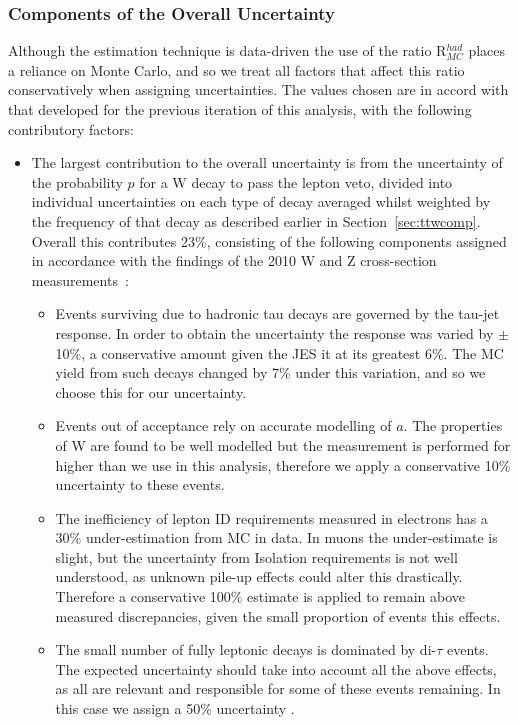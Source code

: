 \subsubsection{Components of the Overall Uncertainty}
Although the estimation technique is data-driven the use of the ratio R$^{had}_{MC}$ places a reliance on Monte Carlo, and so we treat all factors that affect this ratio conservatively when assigning uncertainties. The values chosen are in accord with that developed for the previous iteration of this analysis, with the following contributory factors:
\begin{itemize}
\item The largest contribution to the overall uncertainty is from the uncertainty of the probability $p$ for a W decay to pass the lepton veto, divided into individual uncertainties on each type of decay averaged whilst weighted by the frequency of that decay as described earlier in Section~\ref{sec:ttwcomp}. Overall this contributes 23\%, consisting of the following components assigned in accordance with the findings of the 2010 W and Z cross-section measurements~\cite{WZXS}:
\begin{itemize}
\item Events surviving due to hadronic tau decays are governed by the tau-jet response. In order to obtain the uncertainty the response was varied by $\pm$ 10\%, a conservative amount given the JES it at its greatest 6\%. The MC yield from such decays changed by 7\% under this variation, and so we choose this for our uncertainty. 
\item Events out of acceptance rely on accurate modelling of $a$. The properties of W are found to be well modelled but the measurement is performed for higher \Pt than we use in this analysis, therefore we apply a conservative 10\% uncertainty to these events. 
\item The inefficiency of lepton ID requirements measured in electrons has a 30\% under-estimation from MC in data. In muons the under-estimate is slight, but the uncertainty from Isolation requirements is not well understood, as unknown pile-up effects could alter this drastically. Therefore a conservative 100\% estimate is applied to remain above measured discrepancies, given the small proportion of events this effects. 
\item The small number of fully leptonic \tto decays is dominated by di-$\tau$ events. The expected uncertainty should take into account all the above effects, as all are relevant and responsible for some of these events remaining. In this case we assign a 50\% uncertainty .

\end{itemize}
\end{itemize}
